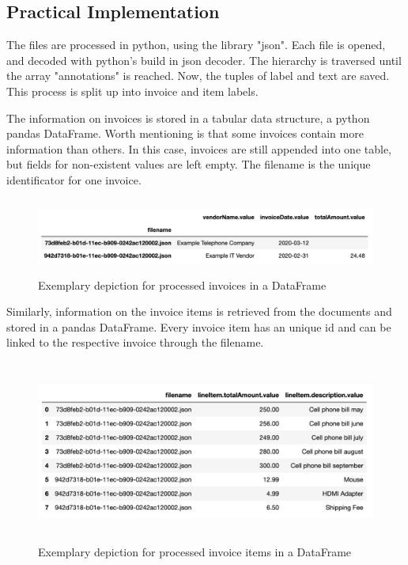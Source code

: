 	
	
    \subsection{Practical Implementation}

	The files are processed in python, using the library "json". Each file is opened, and decoded with python's build in json decoder. The hierarchy is traversed until the array "annotations" is reached. Now, the tuples of label and text are saved. This process is split up into invoice and item labels.
	
	The information on invoices is stored in a tabular data structure, a python pandas DataFrame. Worth mentioning is that some invoices contain more information than others. In this case, invoices are still appended into one table, but fields for non-existent values are left empty. The filename is the unique identificator for one invoice.
	
	\begin{figure}[ht]
		\centering
		\includegraphics[height=2.5cm]{Bilder/practical/df_invoices.png}
		\caption{Exemplary depiction for processed invoices in a DataFrame}
		\label{fig:df-invoices}
	\end{figure}

	Similarly, information on the invoice items is retrieved from the documents and stored in a pandas DataFrame. Every invoice item has an unique id and can be linked to the respective invoice through the filename.
	
	\begin{figure}[ht]
		\centering
		\includegraphics[height=6cm]{Bilder/practical/df_lineitems.png}
		\caption{Exemplary depiction for processed invoice items in a DataFrame}
		\label{fig:df-invoices}
	\end{figure}
	
